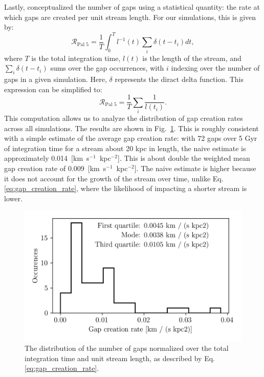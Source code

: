 \documentclass[draft]{aa}
\begin{document}
    Lastly, \citet{2012ApJ...748...20C} conceptualized the number of gaps using a statistical quantity: the rate at which gaps are created per unit stream length. For our simulations, this is given by: \begin{equation} \label{eq:gap_creation_rate}
    \mathcal{R}_{\textrm{Pal 5}} =  \frac{1}{T}\int_{0}^T l^{-1}(t) \sum_i \delta(t-t_i) dt,\end{equation}where $T$ is the total integration time, $l(t)$ is the length of the stream, and $\sum_i \delta(t-t_i)$ sums over the gap occurrences, with $i$ indexing over the number of gaps in a given simulation. Here, $\delta$ represents the diract delta function. This expression can be simplified to:\begin{equation}\mathcal{R}_{\textrm{Pal 5}} =  \frac{1}{T} \sum_i \frac{1}{l (t_i)}. \end{equation}
    This computation allows us to analyze the distribution of gap creation rates across all simulations. The results are shown in Fig.~\ref{fig:TailCoordinates}. This is roughly consistent with a simple estimate of the average gap creation rate: with 72 gaps over 5 Gyr of integration time for a stream about 20 kpc in length, the naive estimate is approximately 0.014~[km~s$^{-1}$~kpc$^{-2}$]. This is about double the weighted mean gap creation rate of 0.009~[km~s$^{-1}$~kpc$^{-2}$]. The naive estimate is higher because it does not account for the growth of the stream over time, unlike Eq.\ref{eq:gap_creation_rate}, where the likelihood of impacting a shorter stream is lower.

      \begin{figure}
        \centering
        \includegraphics[width=\linewidth]{gap_creation_rate.png}
        \caption{The distribution of the number of gaps normalized over the total integration time and unit stream length, as described by Eq.\ref{eq:gap_creation_rate}. }
        \label{fig:TailCoordinates}
      \end{figure}
      
\end{document}

